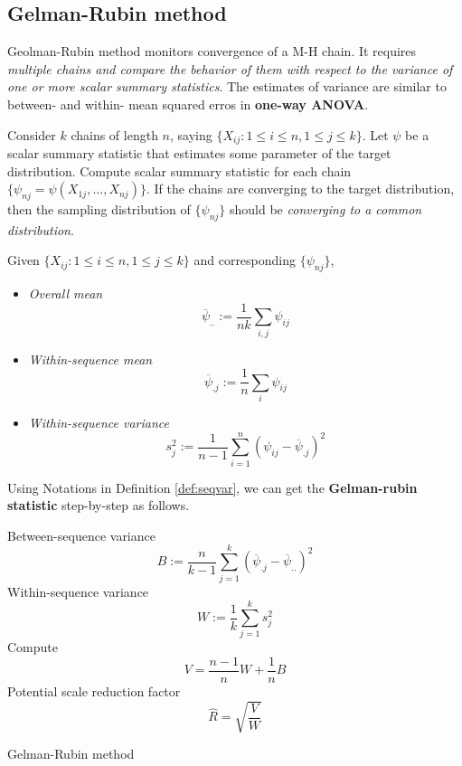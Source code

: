 \documentclass[]{book}
\theoremstyle{definition}
\theoremstyle{definition}
\theoremstyle{definition}
\theoremstyle{remark}
\let\BeginKnitrBlock\begin \let\EndKnitrBlock\end
\begin{document}
\hypertarget{gelman-rubin-method}{%
\subsection{Gelman-Rubin method}\label{gelman-rubin-method}}

Geolman-Rubin method monitors convergence of a M-H chain. It requires \emph{multiple chains and compare the behavior of them with respect to the variance of one or more scalar summary statistics}. The estimates of variance are similar to between- and within- mean squared erros in \textbf{one-way ANOVA}.

Consider \(k\) chains of length \(n\), saying \(\{ X_{ij} : 1 \le i \le n, 1 \le j \le k \}\). Let \(\psi\) be a scalar summary statistic that estimates some parameter of the target distribution. Compute scalar summary statistic for each chain \(\{ \psi_{nj} = \psi(X_{1j}, \ldots, X_{nj}) \}\). If the chains are converging to the target distribution, then the sampling distribution of \(\{ \psi_{nj} \}\) should be \emph{converging to a common distribution}.

\BeginKnitrBlock{definition}[Sequence mean and variance]
\protect\hypertarget{def:seqvar}{}{\label{def:seqvar} {} }Given \(\{ X_{ij} : 1 \le i \le n, 1 \le j \le k \}\) and corresponding \(\{ \psi_{nj} \}\),

\begin{itemize}
  \item \textit{Overall mean} $$\overline{\psi}_{..} := \frac{1}{nk} \sum_{i,j} \psi_{ij}$$
  \item \textit{Within-sequence mean} $$\overline{\psi}_{.j} := \frac{1}{n} \sum_i \psi_{ij}$$
  \item \textit{Within-sequence variance} $$s_j^2 := \frac{1}{n - 1} \sum_{i = 1}^n (\psi_{ij} - \overline{\psi}_{.j})^2$$
\end{itemize}
\EndKnitrBlock{definition}

Using Notations in Definition \ref{def:seqvar}, we can get the \textbf{Gelman-rubin statistic} step-by-step as follows.

\begin{algorithm}[H] \label{alg:gelmanalg}
  \SetAlgoLined
  Between-sequence variance $$B := \frac{n}{k -1}\sum_{j = 1}^k (\overline{\psi}_{.j} - \overline{\psi}_{..})^2$$\;
  Within-sequence variance $$W := \frac{1}{k} \sum_{j = 1}^k s_j^2$$\;
  Compute $$V = \frac{n - 1}{n} W + \frac{1}{n} B$$\; \label{alg:gelpostalg}
  Potential scale reduction factor $$\hat{R} = \sqrt{\frac{V}{W}}$$\; \label{alg:gelpotalg}
  \caption{Gelman-Rubin method}
\end{algorithm}
\end{document}
